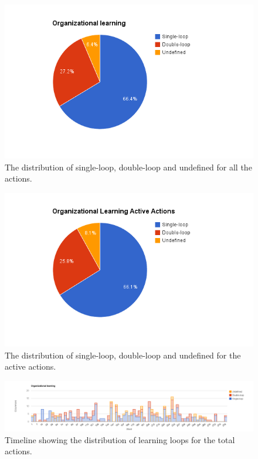\begin{figure}[!h]
	\centering
	\includegraphics[width=\textwidth, keepaspectratio]{figures/learning-p.png}
	\caption{The distribution of single-loop, double-loop and undefined for all the actions.}
	\label{figure:learning-p}
\end{figure}

\begin{figure}[!h]
	\centering
	\includegraphics[width=\textwidth, keepaspectratio]{figures/learning-pa.png}
	\caption{The distribution of single-loop, double-loop and undefined for the active actions.}
	\label{figure:learning-pa}
\end{figure}

\begin{figure}
	\centering
	\includegraphics[width=\textwidth, keepaspectratio]{figures/learning-l.png}
	\caption{Timeline showing the distribution of learning loops for the total actions.}
	\label{figure:learning-la}
\end{figure}

